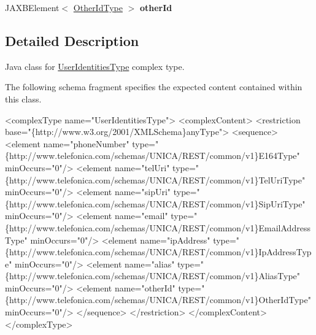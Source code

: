 \begin{DoxyCompactItemize}
\item 
\hypertarget{classcom_1_1telefonica_1_1schemas_1_1unica_1_1rest_1_1directory_1_1v1_1_1UserIdentitiesType_adca1d273b99ec60230a3b86cf709627a}{
JAXBElement$<$ \hyperlink{classcom_1_1telefonica_1_1schemas_1_1unica_1_1rest_1_1common_1_1v1_1_1OtherIdType}{OtherIdType} $>$ {\bfseries otherId}}
\label{classcom_1_1telefonica_1_1schemas_1_1unica_1_1rest_1_1directory_1_1v1_1_1UserIdentitiesType_adca1d273b99ec60230a3b86cf709627a}

\end{DoxyCompactItemize}


\subsection{Detailed Description}
Java class for \hyperlink{classcom_1_1telefonica_1_1schemas_1_1unica_1_1rest_1_1directory_1_1v1_1_1UserIdentitiesType}{UserIdentitiesType} complex type.

The following schema fragment specifies the expected content contained within this class.


\begin{DoxyPre}
 <complexType name="UserIdentitiesType">
   <complexContent>
     <restriction base="\{http://www.w3.org/2001/XMLSchema\}anyType">
       <sequence>
         <element name="phoneNumber" type="\{http://www.telefonica.com/schemas/UNICA/REST/common/v1\}E164Type" minOccurs="0"/>
         <element name="telUri" type="\{http://www.telefonica.com/schemas/UNICA/REST/common/v1\}TelUriType" minOccurs="0"/>
         <element name="sipUri" type="\{http://www.telefonica.com/schemas/UNICA/REST/common/v1\}SipUriType" minOccurs="0"/>
         <element name="email" type="\{http://www.telefonica.com/schemas/UNICA/REST/common/v1\}EmailAddressType" minOccurs="0"/>
         <element name="ipAddress" type="\{http://www.telefonica.com/schemas/UNICA/REST/common/v1\}IpAddressType" minOccurs="0"/>
         <element name="alias" type="\{http://www.telefonica.com/schemas/UNICA/REST/common/v1\}AliasType" minOccurs="0"/>
         <element name="otherId" type="\{http://www.telefonica.com/schemas/UNICA/REST/common/v1\}OtherIdType" minOccurs="0"/>
       </sequence>
     </restriction>
   </complexContent>
 </complexType>
 \end{DoxyPre}
 

